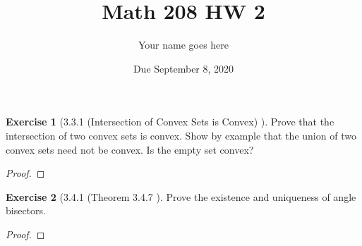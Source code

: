 \documentclass[12pt]{article}		%
\title{Math 208 HW 2}
\author{Your name goes here}
\date{Due September 8, 2020}
\theoremstyle{definition}
\newtheorem*{ex}{Exercise}
\begin{document}
	\maketitle
	
	

	
	\begin{ex}[3.3.1 (Intersection of Convex Sets is Convex) ]
		Prove that the intersection of two convex sets is convex.  Show by example that the union of two convex sets need not be convex.  Is the empty set convex?
	\end{ex}
	
	\begin{proof} 
		
	\end{proof}

\vspace{1in} %

	
	\vspace{.25in}	
	
	\begin{ex}[3.4.1 (Theorem 3.4.7 ]
		Prove the existence and uniqueness of angle bisectors.
	\end{ex}
	
	\begin{proof} 
		
	\end{proof}


\vspace{1in} %
	
	
\end{document}
